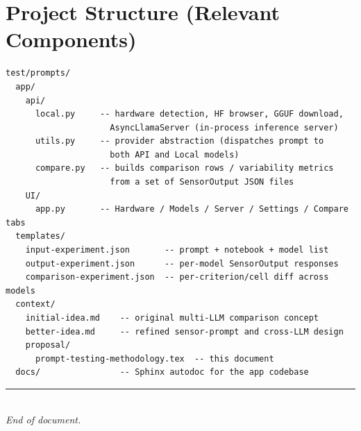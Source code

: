 \documentclass[11pt, a4paper]{article}
\begin{document}
\section{Project Structure (Relevant Components)}

\begin{lstlisting}[style=json, basicstyle=\small\ttfamily]
test/prompts/
  app/
    api/
      local.py     -- hardware detection, HF browser, GGUF download,
                     AsyncLlamaServer (in-process inference server)
      utils.py     -- provider abstraction (dispatches prompt to
                     both API and Local models)
      compare.py   -- builds comparison rows / variability metrics
                     from a set of SensorOutput JSON files
    UI/
      app.py       -- Hardware / Models / Server / Settings / Compare tabs
  templates/
    input-experiment.json       -- prompt + notebook + model list
    output-experiment.json      -- per-model SensorOutput responses
    comparison-experiment.json  -- per-criterion/cell diff across models
  context/
    initial-idea.md    -- original multi-LLM comparison concept
    better-idea.md     -- refined sensor-prompt and cross-LLM design
    proposal/
      prompt-testing-methodology.tex  -- this document
  docs/                -- Sphinx autodoc for the app codebase
\end{lstlisting}

\vfill

\begin{center}
\rule{0.5\textwidth}{0.3pt}\\[6pt]
\small\textit{End of document.}
\end{center}
\end{document}
